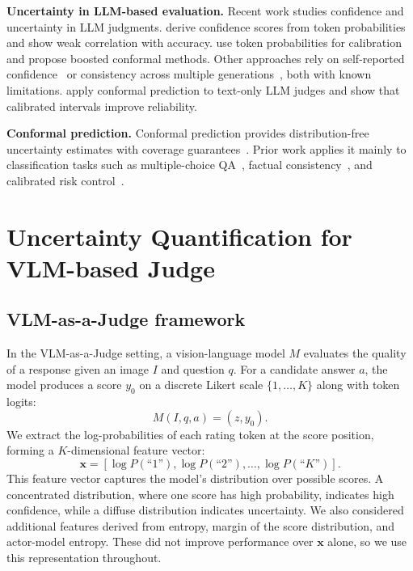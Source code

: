 \documentclass{article}
\begin{document}
\textbf{Uncertainty in LLM-based evaluation.}
Recent work studies confidence and uncertainty in LLM judgments. \citet{wagner2024llmconfidence} derive confidence scores from token probabilities and show weak correlation with accuracy. \citet{xie2024boosted} use token probabilities for calibration and propose boosted conformal methods. Other approaches rely on self-reported confidence~\citep{xiong2024selfconsistency} or consistency across multiple generations~\citep{tian2023consistency}, both with known limitations. \citet{sheng2025analyzing} apply conformal prediction to text-only LLM judges and show that calibrated intervals improve reliability. 

\textbf{Conformal prediction.}
Conformal prediction provides distribution-free uncertainty estimates with coverage guarantees~\citep{vovk2005algorithmic}. Prior work applies it mainly to classification tasks such as multiple-choice QA~\citep{kumar2023conformal,su2024api}, factual consistency~\citep{quach2024conformal,mohri2024language}, and calibrated risk control~\citep{angelopoulos2021conformal}.

\section{Uncertainty Quantification for VLM-based Judge}
\label{sec:uncertainty}

\subsection{VLM-as-a-Judge framework}

In the VLM-as-a-Judge setting, a vision-language model $M$ evaluates the quality of a response given an image $I$ and question $q$. For a candidate answer $a$, the model produces a score $y_0$ on a discrete Likert scale $\{1, \ldots, K\}$ along with token logits:
\begin{equation}
M(I, q, a) = (z, y_0).
\end{equation}
We extract the log-probabilities of each rating token at the score position, forming a $K$-dimensional feature vector:
\begin{equation}
\mathbf{x} = [\log P(\text{``1''}), \log P(\text{``2''}), \ldots, \log P(\text{``$K$''})].
\label{eq:features}
\end{equation}
This feature vector captures the model's distribution over possible scores. A concentrated distribution, where one score has high probability, indicates high confidence, while a diffuse distribution indicates uncertainty. We also considered additional features derived from entropy, margin of the score distribution, and actor-model entropy. These did not improve performance over $\mathbf{x}$ alone, so we use this representation throughout. 
\end{document}
